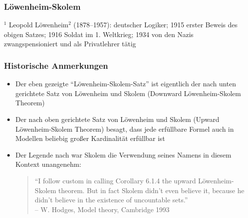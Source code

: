 \documentclass[aspectratio=1610,onlymath]{beamer}
\begin{document}
% 
% 
% 

\begin{frame}\frametitle{Löwenheim-Skolem}


\bigskip

{\footnotesize ${}^1$ Leopold Löwenheim${}^2$ (1878--1957): deutscher Logiker; 1915 erster Beweis des obigen Satzes; 1916 Soldat im 1. Weltkrieg; 1934 von den Nazis zwangspensioniert und als Privatlehrer tätig\\

}

\end{frame}

\begin{frame}\frametitle{Historische Anmerkungen}

\begin{itemize}
\item Der eben gezeigte "`Löwenheim-Skolem-Satz"' ist eigentlich der \alert{nach unten gerichtete Satz von Löwenheim und Skolem} (Downward Löwenheim-Skolem Theorem)
\item Der \alert{nach oben gerichtete Satz von Löwenheim und Skolem}  (Upward Löwenheim-Skolem Theorem) besagt, dass jede erfüllbare Formel auch in Modellen beliebig großer Kardinalität erfüllbar ist\pause
\item Der Legende nach war Skolem die Verwendung seines Namens in diesem Kontext unangenehm:\bigskip

\begin{quote}\color{purple}
"`I follow custom in calling Corollary 6.1.4 the upward Löwenheim-Skolem theorem. But in fact Skolem didn't even believe it, because he didn't believe in the existence of uncountable sets."'\\
-- W. Hodges, Model theory, Cambridge 1993
\end{quote}
\end{itemize}

\end{frame}
\end{document}
